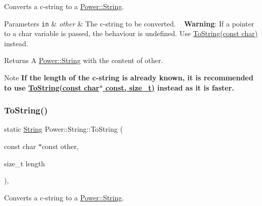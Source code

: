 Converts a c-\/string to a \hyperlink{class_power_1_1_string}{Power\+::\+String}. 


\begin{DoxyParams}[1]{Parameters}
\mbox{\tt in}  & {\em other} & The c-\/string to be converted. ~\newline
 {\bfseries Warning}\+: If a pointer to a char variable is passed, the behaviour is undefined. Use \hyperlink{class_power_1_1_string_a0567cc940b3762eb82b1575b42cdb63a}{To\+String(const char)} instead. \\
\hline
\end{DoxyParams}
\begin{DoxyReturn}{Returns}
A \hyperlink{class_power_1_1_string}{Power\+::\+String} with the content of other. 
\end{DoxyReturn}
\begin{DoxyNote}{Note}
{\bfseries If the length of the c-\/string is already known, it is recommended to use \hyperlink{class_power_1_1_string_afaa0f16b81fa57e2cf63f319931961aa}{To\+String(const char$\ast$ const, size\+\_\+t)} instead as it is faster.} 
\end{DoxyNote}
\mbox{\label{class_power_1_1_string_afaa0f16b81fa57e2cf63f319931961aa}} 
\subsubsection{\texorpdfstring{To\+String()}{ToString()}\hspace{0.1cm}{\footnotesize\ttfamily [2/11]}}
{\footnotesize\ttfamily static \hyperlink{class_power_1_1_string}{String} Power\+::\+String\+::\+To\+String (\begin{DoxyParamCaption}\item[{const char $\ast$const}]{other,  }\item[{size\+\_\+t}]{length }\end{DoxyParamCaption})\hspace{0.3cm}{\ttfamily [inline]}, {\ttfamily [static]}}



Converts a c-\/string to a \hyperlink{class_power_1_1_string}{Power\+::\+String}. 


